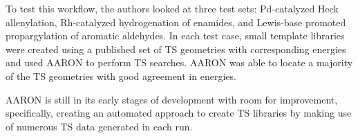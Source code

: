 \documentclass[preprint, 11pt]{elsarticle} %
\begin{document}
To test this workflow, the authors looked at three test sets: Pd-catalyzed Heck allenylation, Rh-catalyzed hydrogenation of enamides, and Lewis-base promoted propargylation of aromatic aldehydes.
In each test case, small template libraries were created using a published set of TS geometries with corresponding energies and used AARON to perform TS searches.
AARON was able to locate a majority of the TS geometries with good agreement in energies.

AARON is still in its early stages of development with room for improvement, specifically, creating an automated approach to create TS libraries by making use of numerous TS data generated in each run.

\end{document}
